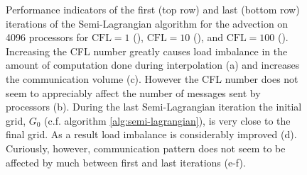 \begin{figure}[htbp]
\begin{center}
	\end{center}
	\caption{Performance indicators of the first (top row) and last (bottom row) iterations of the Semi-Lagrangian algorithm for the advection on 4096 processors for $\text{CFL} = 1$ (), $\text{CFL} = 10$ (), and $\text{CFL} = 100$ (). Increasing the CFL number greatly causes load imbalance in the amount of computation done during interpolation (a) and increases the communication volume (c). However the CFL number does not seem to appreciably affect the number of messages sent by processors (b). During the last Semi-Lagrangian iteration the initial grid, $G_0$ (c.f. algorithm \ref{alg:semi-lagrangian}), is very close to the final grid. As a result load imbalance is considerably improved (d). Curiously, however, communication pattern does not seem to be affected by much between first and last iterations (e-f).}
	\label{fig:communication_4096}
\end{figure}

